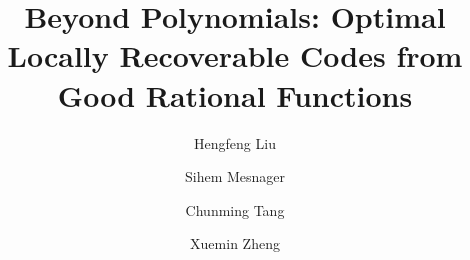 \documentclass[1p,final]{elsarticle}
\newtheorem{open problem}[theorem]{Open Problem}
\begin{document}
	
	
	\begin{frontmatter}
			\title{Beyond Polynomials: Optimal Locally Recoverable Codes from Good Rational Functions}
		
		
		\author[SWJTU]{Hengfeng Liu}
		\author[Paris8,LAGA]{Sihem Mesnager}
		\author[SWJTUT]{Chunming Tang}
		\author[CWNU]{Xuemin Zheng}
		
		
		\address[SWJTU]{School of Mathematics, Southwest Jiaotong University, Chengdu, 611756, China}
		\address[Paris8]{Department of Mathematics, University of Paris VIII, 93526 Saint-Denis, France}
		
		\address[LAGA]{CNRS, UMR 7539 LAGA, University of Paris XIII, 93430 Villetaneuse, France}
		\address[SWJTUT]{School of Information Science and Technology, Southwest Jiaotong University, Chengdu, 611756, China}
		\address[CWNU]{School of Mathematical Sciences, China West Normal University, Nanchong, 637000, China}
		
		
		
			
		
			
		
		
	
		
		
	
		
		
		
		

\end{frontmatter}
\end{document}
